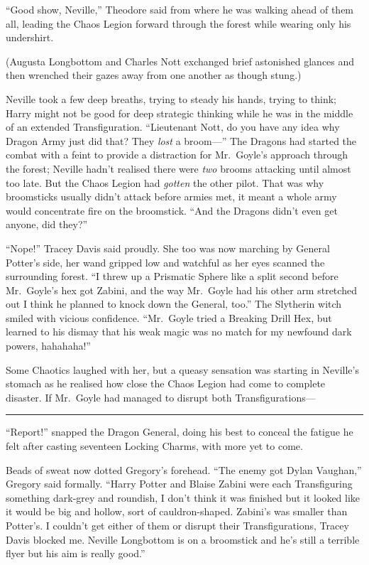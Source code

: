 ``Good show, Neville,'' Theodore said from where he was walking ahead of
them all, leading the Chaos Legion forward through the forest while
wearing only his undershirt.

(Augusta Longbottom and Charles Nott exchanged brief astonished glances
and then wrenched their gazes away from one another as though stung.)

Neville took a few deep breaths, trying to steady his hands, trying to
think; Harry might not be good for deep strategic thinking while he was
in the middle of an extended Transfiguration. ``Lieutenant Nott, do you
have any idea why Dragon Army just did that? They \emph{lost} a
broom---'' The Dragons had started the combat with a feint to provide a
distraction for Mr.~Goyle's approach through the forest; Neville hadn't
realised there were \emph{two} brooms attacking until almost too late.
But the Chaos Legion had \emph{gotten} the other pilot. That was why
broomsticks usually didn't attack before armies met, it meant a whole
army would concentrate fire on the broomstick. ``And the Dragons didn't
even get anyone, did they?''

``Nope!'' Tracey Davis said proudly. She too was now marching by General
Potter's side, her wand gripped low and watchful as her eyes scanned the
surrounding forest. ``I threw up a Prismatic Sphere like a split second
before Mr.~Goyle's hex got Zabini, and the way Mr.~Goyle had his other
arm stretched out I think he planned to knock down the General, too.''
The Slytherin witch smiled with vicious confidence. ``Mr.~Goyle tried a
Breaking Drill Hex, but learned to his dismay that his weak magic was no
match for my newfound dark powers, hahahaha!''

Some Chaotics laughed with her, but a queasy sensation was starting in
Neville's stomach as he realised how close the Chaos Legion had come to
complete disaster. If Mr.~Goyle had managed to disrupt both
Transfigurations---

\begin{center}\rule{3in}{0.4pt}\end{center}

``Report!'' snapped the Dragon General, doing his best to conceal the
fatigue he felt after casting seventeen Locking Charms, with more yet to
come.

Beads of sweat now dotted Gregory's forehead. ``The enemy got Dylan
Vaughan,'' Gregory said formally. ``Harry Potter and Blaise Zabini were
each Transfiguring something dark-grey and roundish, I don't think it
was finished but it looked like it would be big and hollow, sort of
cauldron-shaped. Zabini's was smaller than Potter's. I couldn't get
either of them or disrupt their Transfigurations, Tracey Davis blocked
me. Neville Longbottom is on a broomstick and he's still a terrible
flyer but his aim is really good.''

